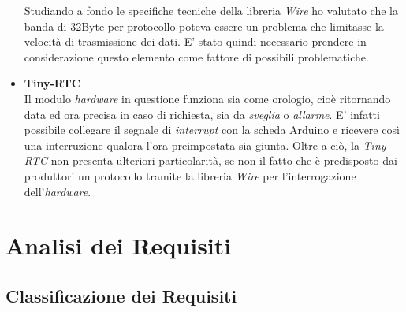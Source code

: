 \begin{itemize}
Studiando a fondo le specifiche tecniche della libreria \textit{Wire} ho valutato che la banda di 32Byte per protocollo poteva essere un problema che limitasse la velocità di trasmissione dei dati. E' stato quindi necessario prendere in considerazione questo elemento come fattore di possibili problematiche.


\item \textbf{Tiny-RTC} \\
Il modulo \textit{hardware} in questione funziona sia come orologio, cioè ritornando data ed ora precisa in caso di richiesta, sia da \textit{sveglia} o \textit{allarme}. E' infatti possibile collegare il segnale di \textit{interrupt}  con la scheda Arduino e ricevere così una interruzione qualora l'ora preimpostata sia giunta. Oltre a ciò, la \textit{Tiny-RTC} non presenta ulteriori particolarità, se non il fatto che è predisposto dai produttori un protocollo tramite la libreria \textit{Wire} per l'interrogazione dell'\textit{hardware}.
\end{itemize}



\section{Analisi dei Requisiti}



\subsection{Classificazione dei Requisiti}

